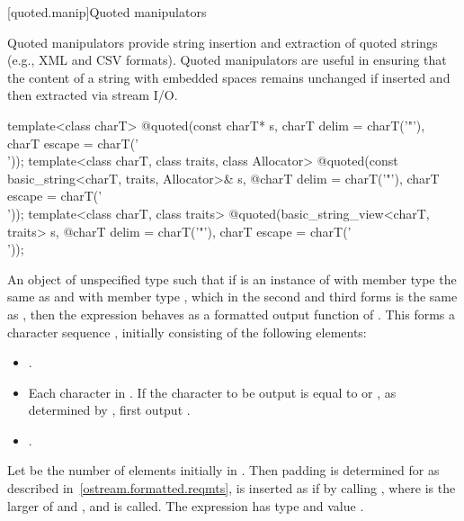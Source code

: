 [quoted.manip]{Quoted manipulators}

\pnum
\begin{note}
Quoted manipulators provide string insertion and extraction of quoted strings
(e.g., XML and CSV formats). Quoted manipulators are useful in ensuring
that the content of a string with embedded spaces remains unchanged
if inserted and then extracted via stream I/O.
\end{note}

%
\begin{itemdecl}
template<class charT>
  @\unspec@ quoted(const charT* s, charT delim = charT('"'), charT escape = charT('\\'));
template<class charT, class traits, class Allocator>
  @\unspec@ quoted(const basic_string<charT, traits, Allocator>& s,
  @\itcorr@                   charT delim = charT('"'), charT escape = charT('\\'));
template<class charT, class traits>
  @\unspec@ quoted(basic_string_view<charT, traits> s,
  @\itcorr@                   charT delim = charT('"'), charT escape = charT('\\'));
\end{itemdecl}

\begin{itemdescr}
\pnum
\returns
An object of unspecified type such that if  is an instance
of  with member type  the same as
 and with member type , which in the second and third
forms is the same as , then the expression
behaves as a formatted output function
of . This forms a character sequence , initially
consisting of the following elements:
\begin{itemize}
\item {}.
\item Each character in . If the character to be output is equal to
 or , as determined by , first
output .
\item {}.
\end{itemize}
Let  be the number of elements initially in .
Then padding is determined for  as described
in~\ref{ostream.formatted.reqmts},  is inserted as if by calling
, where  is the larger of
 and , and  is called.
The expression  has type
 and value .
\end{itemdescr}

